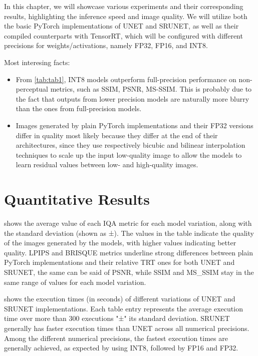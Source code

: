 \label{chap:Experiments}

In this chapter, we will showcase various experiments and their corresponding results, highlighting the inference speed and image quality. We will utilize both the basic PyTorch implementations of UNET and SRUNET, as well as their compiled counterparts with TensorRT, which will be configured with different precisions for weights/activations, namely FP32, FP16, and INT8.

Most interesing facts:
\begin{itemize}
\item{
  From \cref{tab:tab1}, INT8 models outperform full-precision performance on non-perceptual metrics, such as SSIM, PSNR, MS-SSIM. This is probably due to the fact that outputs from lower precision models are naturally more blurry than the ones from full-precision models.
}

\item{
  Images generated by plain PyTorch implementations and their FP32 versions differ in quality most likely because they differ at the end of their architectures, since they use respectively bicubic and bilinear interpolation techniques to scale up the input low-quality image to allow the models to learn residual values between low- and high-quality images.
}

\end{itemize}
\section{Quantitative Results}

 shows the average value of each IQA metric for each model variation, along with the standard deviation (shown as ±). The values in the table indicate the quality of the images generated by the models, with higher values indicating better quality.
LPIPS and BRISQUE metrics underline strong differences between plain PyTorch implementations and their relative TRT ones for both UNET and SRUNET, the same can be said of PSNR, while SSIM and MS\_SSIM stay in the same range of values for each model variation.

 shows the execution times (in seconds) of different variations of UNET and SRUNET implementations. Each table entry represents the average execution time over more than 300 executions "±" its standard deviation. SRUNET generally has faster execution times than UNET across all numerical precisions. Among the different numerical precisions, the fastest execution times are generally achieved, as expected by using INT8, followed by FP16 and FP32.

